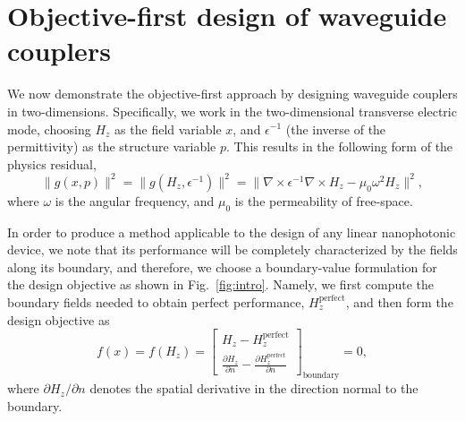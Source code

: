 \documentclass[letterpaper,10pt]{article}
\begin{document}
\section{Objective-first design of waveguide couplers}
We now demonstrate the objective-first approach
    by designing waveguide couplers in two-dimensions.
Specifically, we work in the two-dimensional transverse electric mode,
    choosing $H_z$ as the field variable $x$,
    and $\epsilon^{-1}$ (the inverse of the permittivity) 
    as the structure variable $p$.
This results in the following form of the physics residual,
    \begin{equation}
    \|g(x,p)\|^2 = 
    \|g(H_z, \epsilon^{-1})\|^2 = 
    \| \nabla \times \epsilon^{-1} \nabla \times H_z - \mu_0 \omega^2 H_z \|^2,
    \end{equation}
    where $\omega$ is the angular frequency,
    and $\mu_0$ is the permeability of free-space.

In order to produce a method applicable 
    to the design of any linear nanophotonic device,
    we note that its performance
    will be completely characterized by the fields along its boundary,
    and therefore, 
    we choose a boundary-value formulation for the design objective 
    as shown in Fig.~\ref{fig:intro}.
Namely, we first compute the boundary fields needed to obtain
    perfect performance, $H_z^\text{perfect}$,
    and then form the design objective as
    \begin{equation}
    f(x) = f(H_z) = \begin{bmatrix}
        H_z - H_z^\text{perfect} \\
        \frac{\partial H_z}{\partial n} - 
            \frac{\partial H_z^\text{perfect}}{\partial n}
        \end{bmatrix}_\text{boundary}
        = 0,
    \end{equation}
    where $\partial H_z / \partial n$ 
    denotes the spatial derivative in the direction normal to the boundary.
\end{document}
